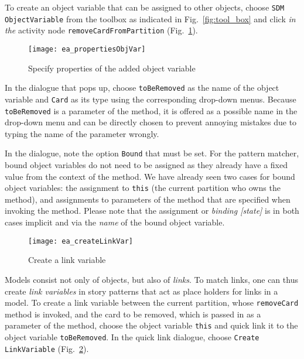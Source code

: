 To create an object variable that can be assigned to other objects, choose \texttt{SDM ObjectVariable} from the toolbox as indicated in Fig.~\ref{fig:tool_box}
and click \emph{in the} activity node \texttt{removeCardFromPartition} (Fig.~\ref{fig:object_variable_properties}).

\begin{figure}[htp]
\begin{center}
  \texttt{[image: ea\_propertiesObjVar]}
  \caption{Specify properties of the added object variable}  
  \label{fig:object_variable_properties}
\end{center}
\end{figure}

In the dialogue that pops up, choose \texttt{toBeRemoved} as the name of the object variable and \texttt{Card} as its type using the corresponding drop-down
menus. Because \texttt{toBeRemoved} is a parameter of the method, it is offered as a possible name in the drop-down menu and can be directly chosen to prevent
annoying mistakes due to typing the name of the parameter wrongly.

In the dialogue, note the option \texttt{Bound} that must be set. For the pattern matcher, bound object variables do not need to be assigned as they already
have a fixed value from the context of the method.   We have already seen two cases  for bound object variables: the assignment to \texttt{this} (the current 
partition who owns the method), and assignments to parameters of the  method that  are specified when invoking the method.   Please note
that the assignment or \emph{binding [state]} is in both cases implicit and via the \emph{name} of the bound object variable.

\begin{figure}[htp]
\begin{center}
  \texttt{[image: ea\_createLinkVar]}
  \caption{Create a link variable}   
  \label{fig:link_variable}
\end{center}
\end{figure}

Models consist not only of objects, but also of \emph{links}. To match links, one can thus create \emph{link variables} in story patterns that act as place
 holders for links in a model. To create a link variable between the current partition, whose \texttt{removeCard} method is invoked, and the
card to be removed, which is passed in as a parameter of the method, choose the object variable \texttt{this} and quick link it to the object variable
\texttt{toBeRemoved}. In the quick link dialogue, choose \texttt{Create LinkVariable} (Fig.~\ref{fig:link_variable}).

